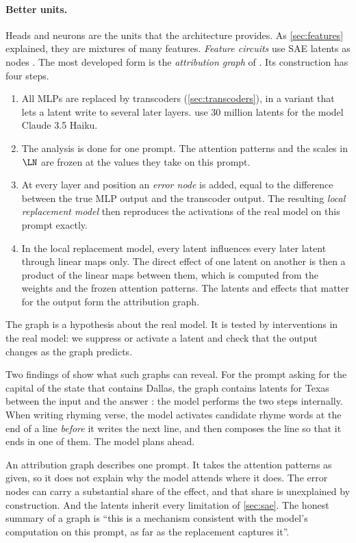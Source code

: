 \paragraph{Better units.} Heads and neurons are the units that the architecture provides. As
\cref{sec:features} explained, they are mixtures of many features. \emph{Feature circuits} use SAE latents as
nodes \citep{marks2025sparse}. The most developed form is the \emph{attribution graph} of
\citet{ameisen2025circuit}. Its construction has four steps.
\begin{enumerate}
\item All MLPs are replaced by transcoders (\cref{sec:transcoders}), in a variant that lets a latent write to
several later layers. \citet{lindsey2025biology} use 30 million latents for the model Claude 3.5 Haiku.
\item The analysis is done for one prompt. The attention patterns and the scales in $\LN$ are frozen at the
values they take on this prompt.
\item At every layer and position an \emph{error node} is added, equal to the difference between the true MLP
output and the transcoder output. The resulting \emph{local replacement model} then reproduces the activations
of the real model on this prompt exactly.
\item In the local replacement model, every latent influences every later latent through linear maps only. The
direct effect of one latent on another is then a product of the linear maps between them, which is computed from
the weights and the frozen attention patterns. The latents and effects that matter for the output form the
attribution graph.
\end{enumerate}
The graph is a hypothesis about the real model. It is tested by interventions in the real model: we suppress
or activate a latent and check that the output changes as the graph predicts.

Two findings of \citet{lindsey2025biology} show what such graphs can reveal. For the prompt asking for the
capital of the state that contains Dallas, the graph contains latents for Texas between the input and the answer
: the model performs the two steps internally. When writing rhyming verse, the model activates
candidate rhyme words at the end of a line \emph{before} it writes the next line, and then composes the line
so that it ends in one of them. The model plans ahead.

\begin{caution}
An attribution graph describes one prompt. It takes the attention patterns as given, so it does not explain
why the model attends where it does. The error nodes can carry a substantial share of the effect, and that
share is unexplained by construction. And the latents inherit every limitation of \cref{sec:sae}. The honest
summary of a graph is ``this is a mechanism consistent with the model's computation on this prompt, as far as
the replacement captures it''.
\end{caution}

